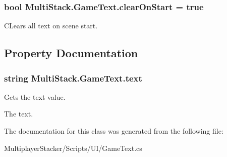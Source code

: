 \subsubsection[{clear\+On\+Start}]{\setlength{\rightskip}{0pt plus 5cm}bool Multi\+Stack.\+Game\+Text.\+clear\+On\+Start = true}\label{class_multi_stack_1_1_game_text_aad503e1eab16a1649865c8ce4dfa2d7c}


C\+Lears all text on scene start. 



\subsection{Property Documentation}
\hypertarget{class_multi_stack_1_1_game_text_a0273e94b02ce232e97172bcc27e1e464}{}
\subsubsection[{text}]{\setlength{\rightskip}{0pt plus 5cm}string Multi\+Stack.\+Game\+Text.\+text\hspace{0.3cm}{\ttfamily [get]}}\label{class_multi_stack_1_1_game_text_a0273e94b02ce232e97172bcc27e1e464}


Gets the text value. 

The text.

The documentation for this class was generated from the following file\+:\begin{DoxyCompactItemize}
\item 
Multiplayer\+Stacker/\+Scripts/\+U\+I/Game\+Text.\+cs\end{DoxyCompactItemize}
